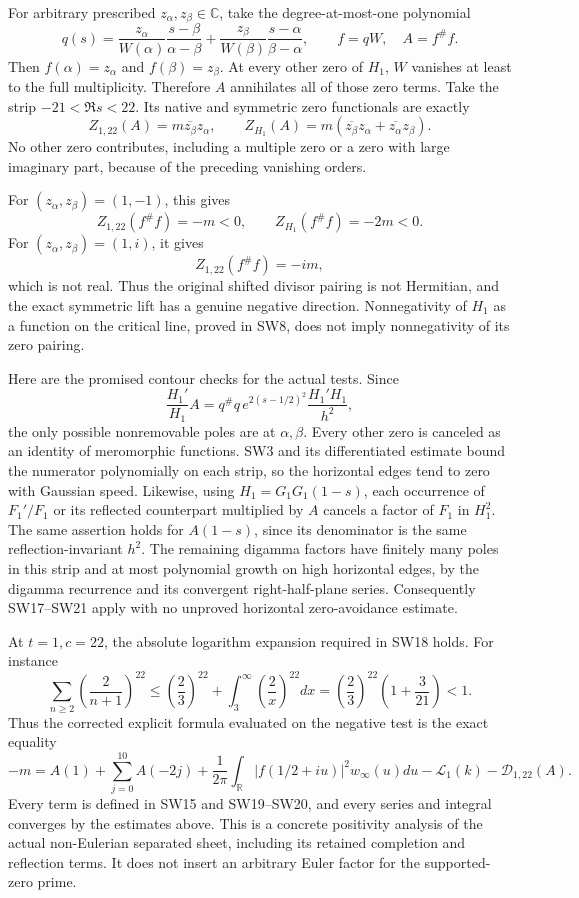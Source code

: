 \documentclass[
  10pt,
  a4paper,
]{article}
\begin{document}
For arbitrary prescribed \(z_\alpha,z_\beta\in\mathbb C\), take the
degree-at-most-one polynomial \[
q(s)=\frac{z_\alpha}{W(\alpha)}\frac{s-\beta}{\alpha-\beta}
+\frac{z_\beta}{W(\beta)}\frac{s-\alpha}{\beta-\alpha},
\qquad f=qW,\quad A=f^\#f.
\tag{SW30}
\] Then \(f(\alpha)=z_\alpha\) and \(f(\beta)=z_\beta\). At every other
zero of \(H_1\), \(W\) vanishes at least to the full multiplicity.
Therefore \(A\) annihilates all of those zero terms. Take the strip
\(-21<\Re s<22\). Its native and symmetric zero functionals are exactly
\[
Z_{1,22}(A)=m\overline{z_\beta}z_\alpha,
\qquad
Z_{H_1}(A)=m(\overline{z_\beta}z_\alpha+\overline{z_\alpha}z_\beta).
\tag{SW31}
\] No other zero contributes, including a multiple zero or a zero with
large imaginary part, because of the preceding vanishing orders.

For \((z_\alpha,z_\beta)=(1,-1)\), this gives \[
\boxed{Z_{1,22}(f^\#f)=-m<0,\qquad Z_{H_1}(f^\#f)=-2m<0.}
\tag{SW32}
\] For \((z_\alpha,z_\beta)=(1,i)\), it gives \[
\boxed{Z_{1,22}(f^\#f)=-im,}
\tag{SW33}
\] which is not real. Thus the original shifted divisor pairing is not
Hermitian, and the exact symmetric lift has a genuine negative
direction. Nonnegativity of \(H_1\) as a function on the critical line,
proved in SW8, does not imply nonnegativity of its zero pairing.

Here are the promised contour checks for the actual tests. Since \[
\frac{H_1'}{H_1}A
=q^\#q\,e^{2(s-1/2)^2}\frac{H_1'H_1}{h^2},
\tag{SW34}
\] the only possible nonremovable poles are at \(\alpha,\beta\). Every
other zero is canceled as an identity of meromorphic functions. SW3 and
its differentiated estimate bound the numerator polynomially on each
strip, so the horizontal edges tend to zero with Gaussian speed.
Likewise, using \(H_1=G_1G_1(1-s)\), each occurrence of \(F_1'/F_1\) or
its reflected counterpart multiplied by \(A\) cancels a factor of
\(F_1\) in \(H_1^2\). The same assertion holds for \(A(1-s)\), since its
denominator is the same reflection-invariant \(h^2\). The remaining
digamma factors have finitely many poles in this strip and at most
polynomial growth on high horizontal edges, by the digamma recurrence
and its convergent right-half-plane series. Consequently SW17--SW21
apply with no unproved horizontal zero-avoidance estimate.

At \(t=1,c=22\), the absolute logarithm expansion required in SW18
holds. For instance \[
\sum_{n\ge2}\left(\frac2{n+1}\right)^{22}
\le\left(\frac23\right)^{22}
+\int_3^\infty\left(\frac2x\right)^{22}dx
=\left(\frac23\right)^{22}\left(1+\frac3{21}\right)<1.
\tag{SW35}
\] Thus the corrected explicit formula evaluated on the negative test is
the exact equality \[
\boxed{
-m=A(1)+\sum_{j=0}^{10}A(-2j)
+\frac1{2\pi}\int_{\mathbb R}|f(1/2+iu)|^2w_\infty(u)du
-\mathcal L_1(k)-\mathcal D_{1,22}(A).
}
\tag{SW36}
\] Every term is defined in SW15 and SW19--SW20, and every series and
integral converges by the estimates above. This is a concrete positivity
analysis of the actual non-Eulerian separated sheet, including its
retained completion and reflection terms. It does not insert an
arbitrary Euler factor for the supported-zero prime.
\end{document}
